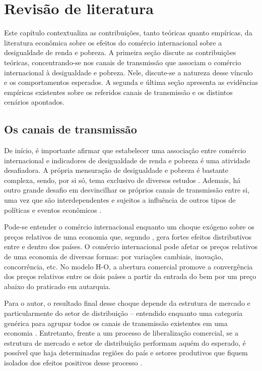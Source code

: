 

\chapter{Revisão de literatura}\label{cha:revisao_de_literatura}

Este capítulo contextualiza as contribuições, tanto teóricas quanto empíricas, da literatura econômica sobre os efeitos do comércio internacional sobre a desigualdade de renda e pobreza. A primeira seção discute as contribuições teóricas, concentrando-se nos canais de transmissão que associam o comércio internacional à desigualdade e pobreza. Nele, discute-se a natureza desse vínculo e os comportamentos esperados. A segunda e última seção apresenta as evidências empíricas existentes sobre os referidos canais de transmissão e os distintos cenários apontados.



\section{Os canais de transmissão}\label{sec:canais_de_transmissao}

De início, é importante afirmar que estabelecer uma associação entre comércio internacional e indicadores de desigualdade de renda e pobreza é uma atividade desafiadora. A própria mensuração de desigualdade e pobreza é bastante complexa, sendo, por si só, tema exclusivo de diversos estudos \cite{neri06, soares09, hoffmann19}. Ademais, há outro grande desafio em desvincilhar os próprios canais de transmissão entre si, uma vez que são interdependentes e sujeitos a influência de outros tipos de políticas e eventos econômicos \cite{bannisterthugge01}.

Pode-se entender o comércio internacional enquanto um choque exógeno sobre os preços relativos de uma economia que, segundo \textcite{winters02}, gera fortes efeitos distributivos entre e dentro dos países. O comércio internacional pode afetar os preços relativos de uma economia de diversas formas: por variações cambiais, inovação, concorrência, etc. No modelo H-O, a abertura comercial promove a convergência dos preços relativos entre os dois países a partir da entrada do bem por um preço abaixo do praticado em autarquia.

Para o autor, o resultado final desse choque depende da estrutura de mercado e particularmente do setor de distribuição -- entendido enquanto uma categoria genérica para agrupar todos os canais de transmissão existentes em uma economia \cite{winters02}. Entretanto, frente a um processo de liberalização comercial, se a estrutura de mercado e setor de distribuição performam aquém do esperado, é possível que haja determinadas regiões do país e setores produtivos que fiquem isolados dos efeitos positivos desse processo \cite{bannisterthugge01}.

